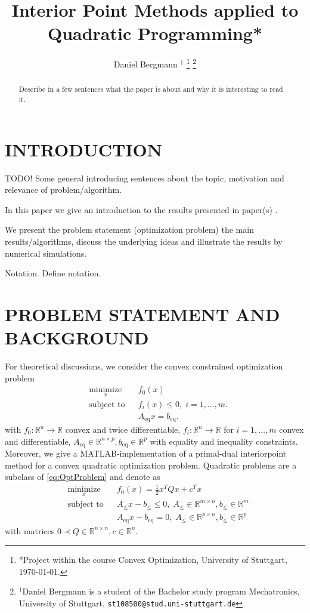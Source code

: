 \documentclass[letterpaper, 10 pt, conference]{ieeeconf}  %
\title{\LARGE \bf Interior Point Methods applied to Quadratic Programming*}
\author{Daniel Bergmann $^{1}$%
\thanks{*Project within the course Convex Optimization, University of Stuttgart, \today.}%
\thanks{$^{1}$Daniel Bergmann is a student of the Bachelor study program Mechatronics, University of Stuttgart,
        {\tt\small st108500@stud.uni-stuttgart.de}}%
}
\newcommand{\R}{\mathbb{R}}
\newcommand{\Rn}{\mathbb{R}^n}
\newcommand{\Rm}{\mathbb{R}^m}
\newcommand{\Rp}{\mathbb{R}^p}
\newcommand{\todo}{{\color{red} TODO!}}
\newcommand{\ind}[2]{{#1}_{\mathrm{#2}}}
\newcommand{\Aeq}{\ind{A}{eq}}
\newcommand{\beq}{\ind{b}{eq}}
\newcommand{\Aineq}{\ind{A}{\leq}}
\newcommand{\bineq}{\ind{b}{\leq}}
\newcommand{\trp}{^T}
\newcommand{\matlab}{MATLAB}
\newcommand{\OptProblem}{
	\begin{aligned}
	& \underset{x}{\text{minimize}}
	& & f_0(x) \\
	& \text{subject to}
	& & f_i(x) \leq 0, \; i = 1, \ldots, m.\\
	& & &\Aeq x = \beq.
	\end{aligned}
	}
\newcommand{\OptProblemquad}{
	\begin{aligned}
		& \underset{x}{\text{minimize}}
		& & f_0(x) =\frac{1}{2} x\trp Q x + c\trp x\\
		& \text{subject to}
		& & \Aineq x - \bineq \leq 0, \; \Aineq \in \R^{m\times n}, \bineq \in \Rm\\
		& & &\Aeq x - \beq = 0, \;  \Aineq \in \R^{p\times n}, \bineq \in \Rp
	\end{aligned}
}
\begin{document}
\maketitle
\thispagestyle{empty}
\pagestyle{empty}


\begin{abstract}

Describe in a few sentences what the paper is about and why it is interesting 
to read it.

\end{abstract}


\section{INTRODUCTION}
\todo
Some general introducing sentences about the topic, motivation and relevance of problem/algorithm.

In this paper we give an introduction to the results presented in paper(s) \cite{Bro-14}.



We present the problem statement (optimization problem)
the main results/algorithms, discuss the underlying ideas and illustrate the results 
by numerical simulations.

Notation. Define notation.

\section{PROBLEM STATEMENT AND BACKGROUND}
For theoretical discussions, we consider the convex constrained optimization problem
\begin{equation}
\OptProblem
\label{eq:OptProblem}
\end{equation}
with $ f_0:\Rn \longrightarrow \R $ convex and twice differentiable, $ f_i:\Rn \longrightarrow \R $ for $ i=1,\dots,m $ convex and differentiable,
$ \Aeq \in \R^{n\times p}, \beq \in  \R^p $ with equality and inequality constraints.
Moreover, we give a \matlab-implementation of a primal-dual interiorpoint method for a convex quadratic optimization problem. Quadratic problems are a subclass of \eqref{eq:OptProblem} and denote as
\begin{equation}
	\OptProblemquad
	\label{eq:QuadProblem}
\end{equation}
with matrices $ 0 \prec Q\in \R^{n \times n}, c\in \Rn. $
\end{document}

